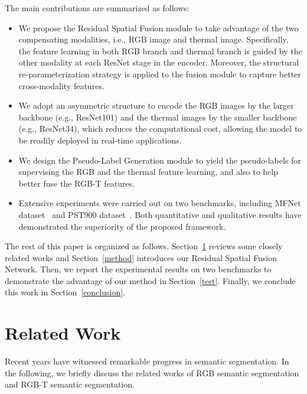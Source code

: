 \documentclass[10.5pt,twocolumn,journal,letterpaper]{IEEEtran}
\newcommand{\eg}{e.g.}
\newcommand{\ie}{i.e.}
\begin{document}
The main contributions are summarized as follows:
\begin{itemize}
  \item We propose the Residual Spatial Fusion module to take advantage of the two compensating modalities, \ie, RGB image and thermal image. Specifically, the feature learning in both RGB branch and thermal branch is guided by the other modality at each ResNet stage in the encoder. Moreover, the structural re-parameterization strategy is applied to the fusion module to capture better cross-modality features.

  \item We adopt an asymmetric structure to encode the RGB images by the larger backbone (\eg, ResNet101) and the thermal images by the smaller backbone (\eg, ResNet34), which reduces the computational cost, allowing the model to be readily deployed in real-time applications.
  
  \item We design the Pseudo-Label Generation module to yield the pseudo-labels for supervising the RGB and the thermal feature learning, and also to help better fuse the RGB-T features.
  
  \item Extensive experiments were carried out on two benchmarks, including MFNet dataset~\cite{ha-iros2017-mfnet} and PST900 dataset~\cite{shivakumar-icra2020-pst900}. Both quantitative and qualitative results have demonstrated the superiority of the proposed framework.

\end{itemize}

The rest of this paper is organized as follows. Section~\ref{related} reviews some closely related works and Section~\ref{method} introduces our Residual Spatial Fusion Network. Then, we report the experimental results on two benchmarks to demonstrate the advantage of our method in Section~\ref{test}. Finally, we conclude this work in Section~\ref{conclusion}.


\section{Related Work}
\label{related}
Recent years have witnessed remarkable progress in semantic segmentation. In the following, we briefly discuss the related works of RGB semantic segmentation and RGB-T semantic segmentation.
\end{document}

